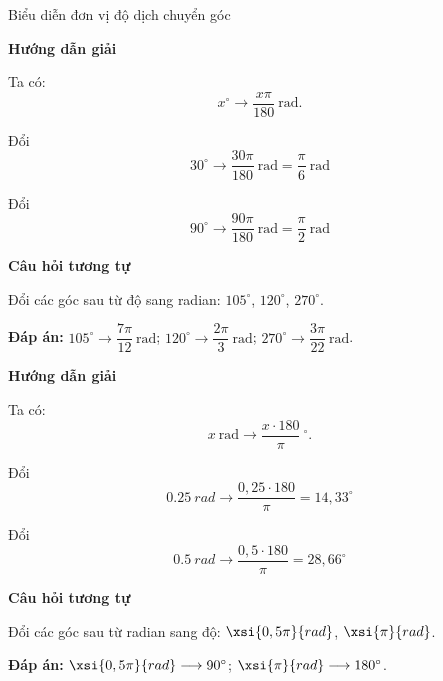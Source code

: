 \begin{dang}{Biểu diễn đơn vị độ dịch chuyển góc}
	{	\begin{center}
			\textbf{Hướng dẫn giải}
		\end{center}
		
		Ta có:
		$$x^\circ \longrightarrow \dfrac{x \pi}{180}\ \text{rad}.$$
		
		Đổi $$30^\circ \longrightarrow \dfrac{30\pi}{180}\ \text{rad} = \dfrac{\pi}{6}\ \text{rad}$$
		
		Đổi $$90^\circ \longrightarrow \dfrac{90\pi}{180}\ \text{rad} = \dfrac{\pi}{2}\ \text{rad}$$
		
		\begin{center}
			\textbf{Câu hỏi tương tự}
		\end{center}
		
		Đổi các góc sau từ độ sang radian: $105^\circ$, $120^\circ$, $270^\circ$.
		
		\textbf{Đáp án:} $105^\circ \longrightarrow \dfrac{7\pi}{12}\ \text{rad}$; $120^\circ \longrightarrow \dfrac{2\pi}{3}\ \text{rad}$; $270^\circ \longrightarrow \dfrac{3\pi}{22}\ \text{rad}$.
	}
	{	\begin{center}
			\textbf{Hướng dẫn giải}
		\end{center}
		
		Ta có:
		$$x\ \text{rad} \longrightarrow \dfrac{x \cdot 180}{\pi}\ ^\circ.$$
		
		Đổi $$\SI{0.25}{rad} \longrightarrow \dfrac{0,25 \cdot 180}{\pi} = 14,33^\circ$$
		
		Đổi $$\SI{0.5}{rad} \longrightarrow \dfrac{0,5 \cdot 180}{\pi} = 28,66^\circ$$
		
		\begin{center}
			\textbf{Câu hỏi tương tự}
		\end{center}
		
		Đổi các góc sau từ radian sang độ: $\xsi{0,5\pi}{rad}$, $\xsi{\pi}{rad}$.
		
		\textbf{Đáp án:} $\xsi{0,5\pi}{rad} \longrightarrow 90^\circ$; $\xsi{\pi}{rad} \longrightarrow 180^\circ$.
	}
\end{dang}
